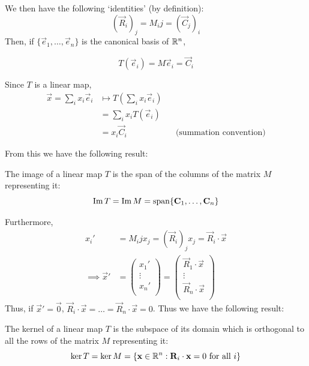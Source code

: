 \documentclass{../template/note}
\begin{document}

    We then have the following `identities' (by definition):
    \[
        (\vec R_i)_j = M_ij = (\vec C_j)_i
    \]
    Then, if \(\{\vec e_1, \dots, \vec e_n\}\) is the canonical basis of \(\mathbb R^n\),

    \[
        T(\vec e_i) = M \vec e_i = \vec C_i
    \]

    Since \(T\) is a linear map,
    \begin{align*}
        \vec x = \sum_i x_i \vec e_i &\mapsto T\left(\sum_i x_i \vec e_i\right) \\
        &= \sum_i x_i T(\vec e_i) \\
        &= x_i \vec C_i && \text{(summation convention)}
    \end{align*}
    
    From this we have the following result:

    \begin{proposition}
        The image of a linear map \(T\) is the span of the columns of the matrix \(M\) representing it:
        \[
            \Im T = \Im M = \Span\{\vec C_1, \dots, \vec C_n\}
        \]
    \end{proposition}
    
    Furthermore,
    \begin{align*}
        x_i' &= M_ij x_j = (\vec R_i)_j x_j = \vec R_i \cdot \vec x \\
        \implies \vec x' &= \begin{pmatrix}
         x_1' \\
         \vdots \\
         x_n' \\
        \end{pmatrix} = \begin{pmatrix}
         \vec R_1 \cdot \vec x \\
         \vdots \\
         \vec R_n \cdot \vec x \\
        \end{pmatrix}
    \end{align*}
    Thus, if \(\vec x' = \vec 0\), \(\vec R_i \cdot \vec x = \dots = \vec R_n \cdot \vec x = 0\). Thus we have the following result:

    \begin{proposition}
        The kernel of a linear map \(T\) is the subspace of its domain which is orthogonal to all the rows of the matrix \(M\) representing it:
        \[
            \ker T = \ker M = \{\vec x \in \RR^n: \vec R_i \cdot \vec x = 0 \text{ for all }i\}
        \]
    \end{proposition}
    
\end{document}
